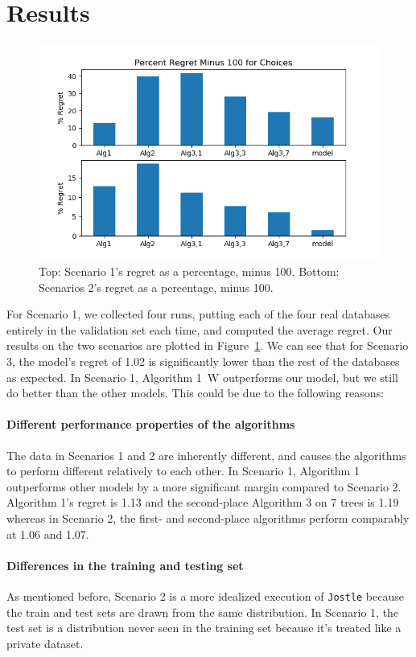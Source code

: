 \documentclass[11pt]{report}
\newcommand{\Jostle}{\texttt{Jostle}}
\begin{document}
\section{Results}
\begin{figure}
\begin{center}
\includegraphics[scale=0.8]{Results}
\end{center}
\caption{Top: Scenario 1's regret as a percentage, minus 100. Bottom: Scenarios 2's regret as a percentage, minus 100.}
\label{fig:results}
\end{figure}
For Scenario 1, we collected four runs, putting each of the four real databases entirely in the validation set each time, and computed the average regret. Our results on the two scenarios are plotted in Figure~\ref{fig:results}. We can see that for Scenario 3, the model's regret of 1.02 is significantly lower than the rest of the databases as expected. In Scenario 1, Algorithm 1~W\cite{Friedman:2010} outperforms our model, but we still do better than the other models. This could be due to the following reasons:
\paragraph{Different performance properties of the algorithms} The data in Scenarios 1 and 2 are inherently different, and causes the algorithms to perform different relatively to each other. In Scenario 1, Algorithm 1 outperforms other models by a more significant margin compared to Scenario 2. Algorithm 1's regret is 1.13 and the second-place Algorithm 3 on 7 trees is 1.19 whereas in Scenario 2, the first- and second-place algorithms perform comparably at 1.06 and 1.07. 
\paragraph{Differences in the training and testing set} As mentioned before, Scenario 2 is a more idealized execution of \Jostle{} because the train and test sets are drawn from the same distribution. In Scenario 1, the test set is a distribution never seen in the training set because it's treated like a private dataset.
\end{document}
